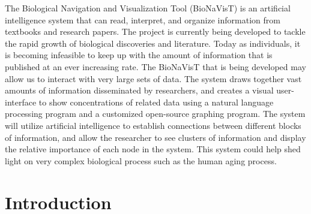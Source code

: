\documentclass[11pt]{article}
\begin{document}
The Biological Navigation and Visualization Tool (BioNaVisT) is an artificial intelligence system that can read, interpret, and organize information from textbooks and research papers. The project is currently being developed to tackle the rapid growth of biological discoveries and literature. Today as individuals, it is becoming infeasible to keep up with the amount of information that is published at an ever increasing rate. The BioNaVisT that is being developed may allow us to interact with very large sets of data. The system draws together vast amounts of information disseminated by researchers, and creates a visual user-interface to show concentrations of related data using a natural language processing program and a customized open-source graphing program. The system will utilize artificial intelligence to establish connections between different blocks of information, and allow the researcher to see clusters of information and display the relative importance of each node in the system. This system could help shed light on very complex biological process such as the human aging process.

\section{Introduction}
\end{document}
